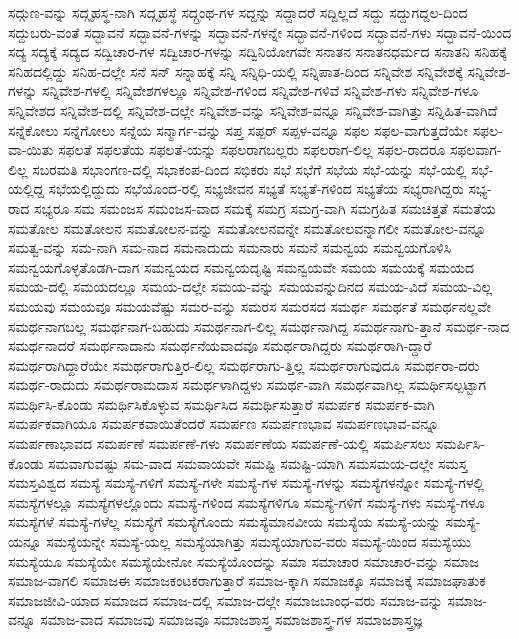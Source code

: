 {ಸದ್ಗುಣ-ವನ್ನು
ಸದ್ಗೃಹಸ್ಥ-ನಾಗಿ
ಸದ್ಗೃಹಸ್ಥೆ
ಸದ್ಗ್ರಂಥ-ಗಳ
ಸದ್ದನ್ನು
ಸದ್ದಾದರೆ
ಸದ್ದಿಲ್ಲದೆ
ಸದ್ದು
ಸದ್ದುಗದ್ದಲ-ದಿಂದ
ಸದ್ದುಬರು-ವಂತೆ
ಸದ್ಭಾವನೆ
ಸದ್ಭಾವನೆ-ಗಳನ್ನು
ಸದ್ಭಾವನೆ-ಗಳನ್ನೇ
ಸದ್ಭಾವನೆ-ಗಳಿಂದ
ಸದ್ಭಾವನೆ-ಗಳು
ಸದ್ಭಾವನೆ-ಯಿಂದ
ಸದ್ಯ
ಸದ್ಯಕ್ಕೆ
ಸದ್ಯದ
ಸದ್ವಿಚಾರ-ಗಳ
ಸದ್ವಿಚಾರ-ಗಳನ್ನು
ಸದ್ವಿನಿಯೋಗವೇ
ಸನಾತನ
ಸನಾತನಧರ್ಮದ
ಸನಾತನಿ
ಸನಿಹಕ್ಕೆ
ಸನಿಹದಲ್ಲಿದ್ದು
ಸನಿಹ-ದಲ್ಲೇ
ಸನೆ
ಸನ್
ಸನ್ನಾಹಕ್ಕೆ
ಸನ್ನಿ
ಸನ್ನಿಧಿ-ಯಲ್ಲಿ
ಸನ್ನಿಪಾತ-ದಿಂದ
ಸನ್ನಿವೇಶ
ಸನ್ನಿವೇಶಕ್ಕೆ
ಸನ್ನಿವೇಶ-ಗಳನ್ನು
ಸನ್ನಿವೇಶ-ಗಳಲ್ಲಿ
ಸನ್ನಿವೇಶಗಳಲ್ಲೂ
ಸನ್ನಿವೇಶ-ಗಳಿಂದ
ಸನ್ನಿವೇಶ-ಗಳಿವೆ
ಸನ್ನಿವೇಶ-ಗಳು
ಸನ್ನಿವೇಶ-ಗಳೂ
ಸನ್ನಿವೇಶದ
ಸನ್ನಿವೇಶ-ದಲ್ಲಿ
ಸನ್ನಿವೇಶ-ದಲ್ಲೇ
ಸನ್ನಿವೇಶ-ವನ್ನು
ಸನ್ನಿವೇಶ-ವನ್ನೂ
ಸನ್ನಿವೇಶ-ವಾಗಿತ್ತು
ಸನ್ನಿಹಿತ-ವಾಗಿದೆ
ಸನ್ನೆಕೋಲು
ಸನ್ನೆಗೋಲು
ಸನ್ನೆಯ
ಸನ್ಮಾರ್ಗ-ವನ್ನು
ಸಪ್ತ
ಸಪ್ಪರ್
ಸಪ್ಪಳ-ವನ್ನೂ
ಸಫಲ
ಸಫಲ-ವಾಗುತ್ತದೆಯೇ
ಸಫಲ-ವಾ-ಯಿತು
ಸಫಲತೆ
ಸಫಲತೆಯ
ಸಫಲತೆ-ಯನ್ನು
ಸಫಲರಾಗಬಲ್ಲರು
ಸಫಲರಾಗ-ಲಿಲ್ಲ
ಸಫಲ-ರಾದರೂ
ಸಫಲವಾಗ-ಲಿಲ್ಲ
ಸಬರಮತಿ
ಸಭಾಂಗಣ-ದಲ್ಲಿ
ಸಭಾಕಂಪ-ದಿಂದ
ಸಭಿಕರು
ಸಭೆ
ಸಭೆಗೆ
ಸಭೆಯ
ಸಭೆ-ಯನ್ನು
ಸಭೆ-ಯಲ್ಲಿ
ಸಭೆ-ಯಲ್ಲಿದ್ದ
ಸಭೆಯಲ್ಲಿದ್ದುದು
ಸಭೆಯೊಂದ-ರಲ್ಲಿ
ಸಭ್ಯಜೀವನ
ಸಭ್ಯತೆ
ಸಭ್ಯತೆ-ಗಳಿಂದ
ಸಭ್ಯತೆಯ
ಸಭ್ಯರಾಗಿದ್ದರು
ಸಭ್ಯ-ರಾದ
ಸಭ್ಯರೂ
ಸಮ
ಸಮಂಜಸ
ಸಮಂಜಸ-ವಾದ
ಸಮಕ್ಕೆ
ಸಮಗ್ರ
ಸಮಗ್ರ-ವಾಗಿ
ಸಮಗ್ರಹಿತ
ಸಮಚಿತ್ತತೆ
ಸಮತೆಯ
ಸಮತೋಲ
ಸಮತೋಲನ
ಸಮತೋಲನ-ವನ್ನು
ಸಮತೋಲನವನ್ನೇ
ಸಮತೋಲವನ್ನಾಗಲೀ
ಸಮತೋಲ-ವನ್ನೂ
ಸಮತ್ವ-ವನ್ನು
ಸಮ-ನಾಗಿ
ಸಮ-ನಾದ
ಸಮನಾದುದು
ಸಮನಾರು
ಸಮನೆ
ಸಮನ್ವಯ
ಸಮನ್ವಯಗೊಳಿಸಿ
ಸಮನ್ವಯಗೊಳ್ಳತೊಡಗಿ-ದಾಗ
ಸಮನ್ವಯದ
ಸಮನ್ವಯದೃಷ್ಟಿ
ಸಮನ್ವಯವೇ
ಸಮಯ
ಸಮಯಕ್ಕೆ
ಸಮಯದ
ಸಮಯ-ದಲ್ಲಿ
ಸಮಯದಲ್ಲೂ
ಸಮಯ-ದಲ್ಲೇ
ಸಮಯ-ವನ್ನು
ಸಮಯವನ್ನುದಿನದ
ಸಮಯ-ವಿದೆ
ಸಮಯ-ವಿಲ್ಲ
ಸಮಯವು
ಸಮಯವೂ
ಸಮಯವೆಷ್ಟು
ಸಮರ-ವನ್ನು
ಸಮರಸ
ಸಮರಸದ
ಸಮರ್ಥ
ಸಮರ್ಥತೆ
ಸಮರ್ಥನಲ್ಲವೇ
ಸಮರ್ಥನಾಗಬಲ್ಲ
ಸಮರ್ಥನಾಗ-ಬಹುದು
ಸಮರ್ಥನಾಗ-ಲಿಲ್ಲ
ಸಮರ್ಥನಾಗಿದ್ದ
ಸಮರ್ಥನಾಗು-ತ್ತಾನೆ
ಸಮರ್ಥ-ನಾದ
ಸಮರ್ಥನಾದರೆ
ಸಮರ್ಥನಾದಾನು
ಸಮರ್ಥನೆಯವಾದವೂ
ಸಮರ್ಥರಾಗಿದ್ದರು
ಸಮರ್ಥರಾಗಿ-ದ್ದಾರೆ
ಸಮರ್ಥರಾಗಿದ್ದಾರೆಯೇ
ಸಮರ್ಥರಾಗುತ್ತಿರ-ಲಿಲ್ಲ
ಸಮರ್ಥರಾಗು-ತ್ತಿಲ್ಲ
ಸಮರ್ಥರಾಗುವುದೂ
ಸಮರ್ಥರಾ-ದರು
ಸಮರ್ಥ-ರಾದುದು
ಸಮರ್ಥರಾಮದಾಸ
ಸಮರ್ಥಳಾಗಿದ್ದಳು
ಸಮರ್ಥ-ವಾಗಿ
ಸಮರ್ಥವಾಗಿಲ್ಲ
ಸಮರ್ಥಿಸಲ್ಪಟ್ಟಾಗ
ಸಮರ್ಥಿಸಿ-ಕೊಂಡು
ಸಮರ್ಥಿಸಿಕೊಳ್ಳುವ
ಸಮರ್ಥಿಸಿದ
ಸಮರ್ಥಿಸುತ್ತಾರೆ
ಸಮರ್ಪಕ
ಸಮರ್ಪಕ-ವಾಗಿ
ಸಮರ್ಪಕವಾಗಿಯೂ
ಸಮರ್ಪಕವಾಯಿತೆಂದರೆ
ಸಮರ್ಪಣ
ಸಮರ್ಪಣಭಾವ
ಸಮರ್ಪಣಭಾವ-ವನ್ನೂ
ಸಮರ್ಪಣಾಭಾವದ
ಸಮರ್ಪಣೆ
ಸಮರ್ಪಣೆ-ಗಳು
ಸಮರ್ಪಣೆಯ
ಸಮರ್ಪಣೆ-ಯಲ್ಲಿ
ಸಮರ್ಪಿಸಲು
ಸಮರ್ಪಿಸಿ-ಕೊಂಡು
ಸಮವಾಗುವಷ್ಟು
ಸಮ-ವಾದ
ಸಮವಾಯವೇ
ಸಮಷ್ಟಿ
ಸಮಷ್ಟಿ-ಯಾಗಿ
ಸಮಸಮಯ-ದಲ್ಲೇ
ಸಮಸ್ತ
ಸಮಸ್ತವಿಶ್ವದ
ಸಮಸ್ಯೆ
ಸಮಸ್ಯೆ-ಗಳಿಗೆ
ಸಮಸ್ಯೆ-ಗಳೇ
ಸಮಸ್ಯೆ-ಗಳ
ಸಮಸ್ಯೆ-ಗಳನ್ನು
ಸಮಸ್ಯೆಗಳನ್ನೋ
ಸಮಸ್ಯೆ-ಗಳಲ್ಲಿ
ಸಮಸ್ಯೆಗಳಲ್ಲೂ
ಸಮಸ್ಯೆಗಳಲ್ಲೊಂದು
ಸಮಸ್ಯೆ-ಗಳಿಂದ
ಸಮಸ್ಯೆಗಳಿಗೂ
ಸಮಸ್ಯೆ-ಗಳಿಗೆ
ಸಮಸ್ಯೆ-ಗಳು
ಸಮಸ್ಯೆ-ಗಳೂ
ಸಮಸ್ಯೆಗಳೆ
ಸಮಸ್ಯೆ-ಗಳೆಲ್ಲ
ಸಮಸ್ಯೆಗೆ
ಸಮಸ್ಯೆಗೊಂದು
ಸಮಸ್ಯೆಮಾನವೀಯ
ಸಮಸ್ಯೆಯ
ಸಮಸ್ಯೆ-ಯನ್ನು
ಸಮಸ್ಯೆ-ಯನ್ನೂ
ಸಮಸ್ಯೆಯನ್ನೇ
ಸಮಸ್ಯೆ-ಯಲ್ಲ
ಸಮಸ್ಯೆಯಾಗಿತ್ತು
ಸಮಸ್ಯೆಯಾಗುವ-ವರು
ಸಮಸ್ಯೆ-ಯಿಂದ
ಸಮಸ್ಯೆಯು
ಸಮಸ್ಯೆಯೂ
ಸಮಸ್ಯೆಯೇ
ಸಮಸ್ಯೆಯೇನೋ
ಸಮಸ್ಯೆಯೊಂದನ್ನು
ಸಮಾ
ಸಮಾಚಾರ
ಸಮಾಚಾರ-ವನ್ನು
ಸಮಾಜ
ಸಮಾಜ-ವಾಗಲಿ
ಸಮಾಜಈ
ಸಮಾಜಕಂಟಕರಾಗುತ್ತಾರೆ
ಸಮಾಜ-ಕ್ಕಾಗಿ
ಸಮಾಜಕ್ಕೂ
ಸಮಾಜಕ್ಕೆ
ಸಮಾಜಘಾತುಕ
ಸಮಾಜಜೀವಿ-ಯಾದ
ಸಮಾಜದ
ಸಮಾಜ-ದಲ್ಲಿ
ಸಮಾಜ-ದಲ್ಲೇ
ಸಮಾಜಬಾಂಧ-ವರು
ಸಮಾಜ-ವನ್ನು
ಸಮಾಜ-ವನ್ನೂ
ಸಮಾಜ-ವಾದ
ಸಮಾಜವು
ಸಮಾಜವೂ
ಸಮಾಜಶಾಸ್ತ್ರ
ಸಮಾಜಶಾಸ್ತ್ರ-ಗಳ
ಸಮಾಜಶಾಸ್ತ್ರಜ್ಞ
}
